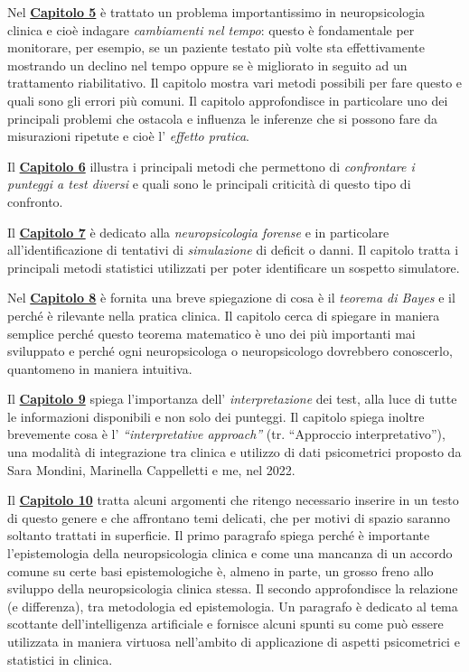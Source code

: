 \documentclass[
  italian,
  letterpaper,
  paper=6in:9in,
  pagesize=pdftex,
  headinclude=on,
  footinclude=on,
  11pt]{scrbook}
\begin{document}
Nel \hyperref[Capitolo-5]{\textbf{Capitolo 5}} è trattato un problema
importantissimo in neuropsicologia clinica e cioè indagare
\emph{cambiamenti nel tempo}: questo è fondamentale per monitorare, per
esempio, se un paziente testato più volte sta effettivamente mostrando
un declino nel tempo oppure se è migliorato in seguito ad un trattamento
riabilitativo. Il capitolo mostra vari metodi possibili per fare questo
e quali sono gli errori più comuni. Il capitolo approfondisce in
particolare uno dei principali problemi che ostacola e influenza le
inferenze che si possono fare da misurazioni ripetute e cioè l'
\emph{effetto pratica}.

Il \hyperref[Capitolo-6]{\textbf{Capitolo 6}} illustra i principali
metodi che permettono di \emph{confrontare i punteggi a test diversi} e
quali sono le principali criticità di questo tipo di confronto.

Il \hyperref[Capitolo-7]{\textbf{Capitolo 7}} è dedicato alla
\emph{neuropsicologia forense} e in particolare all'identificazione di
tentativi di \emph{simulazione} di deficit o danni. Il capitolo tratta i
principali metodi statistici utilizzati per poter identificare un
sospetto simulatore.

Nel \hyperref[Capitolo-8]{\textbf{Capitolo 8}} è fornita una breve
spiegazione di cosa è il \emph{teorema di Bayes} e il perché è rilevante
nella pratica clinica. Il capitolo cerca di spiegare in maniera semplice
perché questo teorema matematico è uno dei più importanti mai sviluppato
e perché ogni neuropsicologa o neuropsicologo dovrebbero conoscerlo,
quantomeno in maniera intuitiva.

Il \hyperref[Capitolo-9]{\textbf{Capitolo 9}} spiega l'importanza dell'
\emph{interpretazione} dei test, alla luce di tutte le informazioni
disponibili e non solo dei punteggi. Il capitolo spiega inoltre
brevemente cosa è l' \emph{``interpretative approach''} (tr. ``Approccio
interpretativo''), una modalità di integrazione tra clinica e utilizzo
di dati psicometrici proposto da Sara Mondini, Marinella Cappelletti e
me, nel 2022.

Il \hyperref[Capitolo-10]{\textbf{Capitolo 10}} tratta alcuni argomenti
che ritengo necessario inserire in un testo di questo genere e che
affrontano temi delicati, che per motivi di spazio saranno soltanto
trattati in superficie. Il primo paragrafo spiega perché è importante
l'epistemologia della neuropsicologia clinica e come una mancanza di un
accordo comune su certe basi epistemologiche è, almeno in parte, un
grosso freno allo sviluppo della neuropsicologia clinica stessa. Il
secondo approfondisce la relazione (e differenza), tra metodologia ed
epistemologia. Un paragrafo è dedicato al tema scottante
dell'intelligenza artificiale e fornisce alcuni spunti su come può
essere utilizzata in maniera virtuosa nell'ambito di applicazione di
aspetti psicometrici e statistici in clinica.
\end{document}
